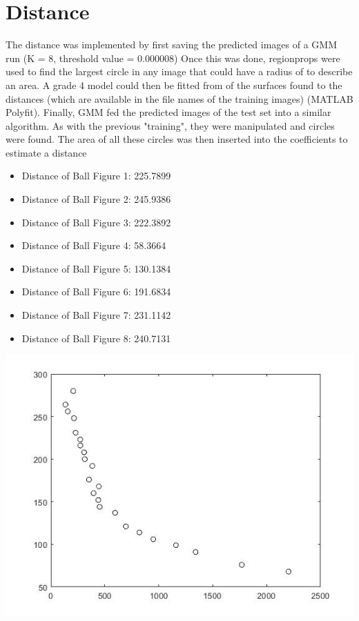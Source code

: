 \documentclass{article}
\begin{document}
\section{Distance}
    \item The distance was implemented by first saving the predicted images of a GMM run (K = 8, threshold value = 0.000008) Once this was done,  regionprops were used to find the largest circle in any image that could have a radius of  to describe an area. A grade 4 model could then be fitted from  of the surfaces found to the distances (which are available in the file names of the training images) (MATLAB Polyfit). Finally,  GMM fed the predicted images of the test set into a similar algorithm. As with the previous "training", they were manipulated and circles were found. The area of all these circles was then inserted into the coefficients to estimate a distance 
    \begin{itemize}
        \item Distance of Ball Figure 1: 225.7899
        \item Distance of Ball Figure 2: 245.9386
        \item Distance of Ball Figure 3: 222.3892
        \item Distance of Ball Figure 4: 58.3664
        \item Distance of Ball Figure 5: 130.1384
        \item Distance of Ball Figure 6: 191.6834
        \item Distance of Ball Figure 7: 231.1142
        \item Distance of Ball Figure 8: 240.7131

    \end{itemize}

    \includegraphics[scale = 0.6]{polyfitForMeasureDepth.jpg}
    
\end{document}
